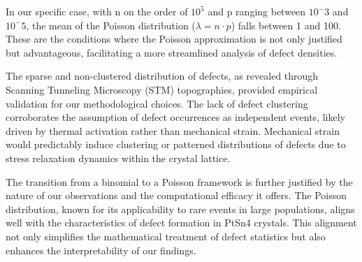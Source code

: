 \par In our specific case, with n on the order of $10^5$ and p ranging between $10^-3$ and $10^-5$, the mean of the Poisson distribution ($\lambda=n\cdot p$) falls between 1 and 100. These are the conditions where the Poisson approximation is not only justified but advantageous, facilitating a more streamlined analysis of defect densities.
\par The sparse and non-clustered distribution of defects, as revealed through Scanning Tunneling Microscopy (STM) topographies, provided empirical validation for our methodological choices. The lack of defect clustering corroborates the assumption of defect occurrences as independent events, likely driven by thermal activation rather than mechanical strain. Mechanical strain would predictably induce clustering or patterned distributions of defects due to stress relaxation dynamics within the crystal lattice.
\par The transition from a binomial to a Poisson framework is further justified by the nature of our observations and the computational efficacy it offers. The Poisson distribution, known for its applicability to rare events in large populations, aligns well with the characteristics of defect formation in PtSn4 crystals. This alignment not only simplifies the mathematical treatment of defect statistics but also enhances the interpretability of our findings.

